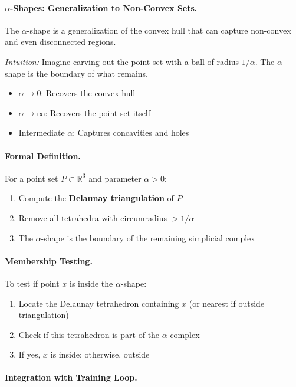 \paragraph{$\alpha$-Shapes: Generalization to Non-Convex Sets.}
The $\alpha$-shape is a generalization of the convex hull that can capture non-convex and even disconnected regions.

\textit{Intuition:} Imagine carving out the point set with a ball of radius $1/\alpha$. The $\alpha$-shape is the boundary of what remains.

\begin{itemize}
    \item $\alpha \to 0$: Recovers the convex hull
    \item $\alpha \to \infty$: Recovers the point set itself
    \item Intermediate $\alpha$: Captures concavities and holes
\end{itemize}

\paragraph{Formal Definition.}
For a point set $P \subset \mathbb{R}^3$ and parameter $\alpha > 0$:
\begin{enumerate}
    \item Compute the \textbf{Delaunay triangulation} of $P$
    \item Remove all tetrahedra with circumradius $> 1/\alpha$
    \item The $\alpha$-shape is the boundary of the remaining simplicial complex
\end{enumerate}

\paragraph{Membership Testing.}
To test if point $x$ is inside the $\alpha$-shape:
\begin{enumerate}
    \item Locate the Delaunay tetrahedron containing $x$ (or nearest if outside triangulation)
    \item Check if this tetrahedron is part of the $\alpha$-complex
    \item If yes, $x$ is inside; otherwise, outside
\end{enumerate}

\paragraph{Integration with Training Loop.}

